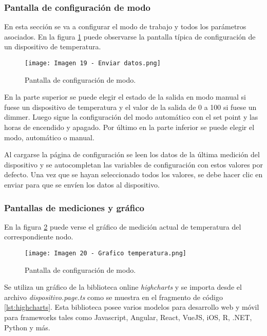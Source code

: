 \subsubsection{Pantalla de configuración de modo}

En esta sección se va a configurar el modo de trabajo y todos los parámetros asociados. En la figura \ref{fig:19} puede observarse la pantalla típica de configuración de un dispositivo de temperatura.

\begin{figure}[h]
\centering
\texttt{[image: Imagen 19 - Enviar datos.png]}
\caption[Pantalla de configuración de modo]{Pantalla de configuración de modo. \footnotemark}
\label{fig:19}
\end{figure}

En la parte superior se puede elegir el estado de la salida en modo manual si fuese un dispositivo de temperatura y el valor de la salida de 0 a 100 si fuese un dimmer. Luego sigue la configuración del modo automático con el set point y las horas de encendido y apagado. Por último en la parte inferior se puede elegir el modo, automático o manual.

Al cargarse la página de configuración se leen los datos de la última medición del dispositivo y se autocompletan las variables de configuración con estos valores por defecto. Una vez que se hayan seleccionado todos los valores, se debe hacer clic en enviar para que se envíen los datos al dispositivo.

\subsubsection{Pantallas de mediciones y gráfico}

En la figura \ref{fig:20} puede verse el gráfico de medición actual de temperatura del correspondiente nodo.

\begin{figure}[h]
\centering
\texttt{[image: Imagen 20 - Grafico temperatura.png]}
\caption[Pantalla de configuración de modo]{Pantalla de configuración de modo. \footnotemark}
\label{fig:20}
\end{figure}

Se utiliza un gráfico de la biblioteca online \textit{highcharts} y se importa desde el archivo \textit{dispositivo.page.ts} como se muestra en el fragmento de código \ref{lst:highcharts}. Esta biblioteca posee varios modelos para desarrollo web y móvil para frameworks tales como Javascript, Angular, React, VueJS, iOS, R, .NET, Python y más\citep{24}.

